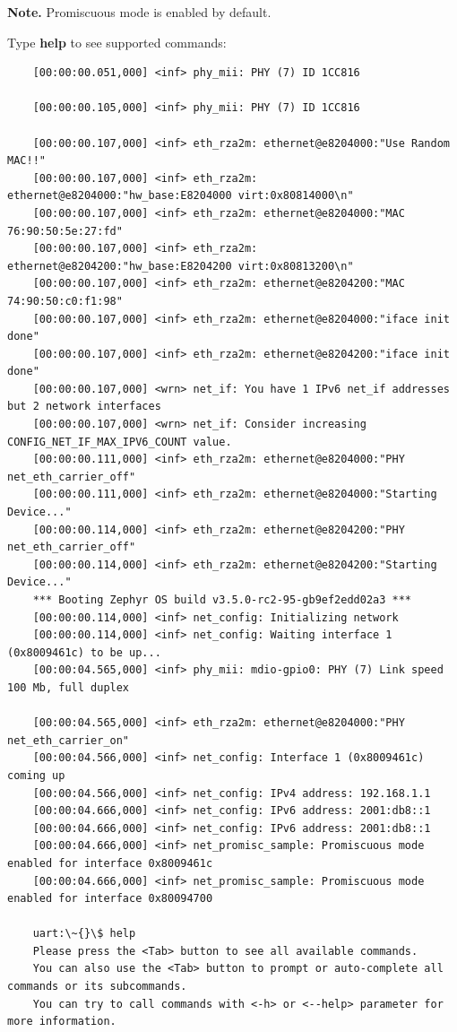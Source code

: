 \documentclass[11pt,a4paper,oneside]{article}
\begin{document}
\textbf{Note.} Promiscuous mode is enabled by default.

Type \textbf{help} to see supported commands:
\begin{lstlisting}
	[00:00:00.051,000] <inf> phy_mii: PHY (7) ID 1CC816

	[00:00:00.105,000] <inf> phy_mii: PHY (7) ID 1CC816

	[00:00:00.107,000] <inf> eth_rza2m: ethernet@e8204000:"Use Random MAC!!"
	[00:00:00.107,000] <inf> eth_rza2m: ethernet@e8204000:"hw_base:E8204000 virt:0x80814000\n"
	[00:00:00.107,000] <inf> eth_rza2m: ethernet@e8204000:"MAC 76:90:50:5e:27:fd"
	[00:00:00.107,000] <inf> eth_rza2m: ethernet@e8204200:"hw_base:E8204200 virt:0x80813200\n"
	[00:00:00.107,000] <inf> eth_rza2m: ethernet@e8204200:"MAC 74:90:50:c0:f1:98"
	[00:00:00.107,000] <inf> eth_rza2m: ethernet@e8204000:"iface init done"
	[00:00:00.107,000] <inf> eth_rza2m: ethernet@e8204200:"iface init done"
	[00:00:00.107,000] <wrn> net_if: You have 1 IPv6 net_if addresses but 2 network interfaces
	[00:00:00.107,000] <wrn> net_if: Consider increasing CONFIG_NET_IF_MAX_IPV6_COUNT value.
	[00:00:00.111,000] <inf> eth_rza2m: ethernet@e8204000:"PHY net_eth_carrier_off"
	[00:00:00.111,000] <inf> eth_rza2m: ethernet@e8204000:"Starting Device..."
	[00:00:00.114,000] <inf> eth_rza2m: ethernet@e8204200:"PHY net_eth_carrier_off"
	[00:00:00.114,000] <inf> eth_rza2m: ethernet@e8204200:"Starting Device..."
	*** Booting Zephyr OS build v3.5.0-rc2-95-gb9ef2edd02a3 ***
	[00:00:00.114,000] <inf> net_config: Initializing network
	[00:00:00.114,000] <inf> net_config: Waiting interface 1 (0x8009461c) to be up...
	[00:00:04.565,000] <inf> phy_mii: mdio-gpio0: PHY (7) Link speed 100 Mb, full duplex

	[00:00:04.565,000] <inf> eth_rza2m: ethernet@e8204000:"PHY net_eth_carrier_on"
	[00:00:04.566,000] <inf> net_config: Interface 1 (0x8009461c) coming up
	[00:00:04.566,000] <inf> net_config: IPv4 address: 192.168.1.1
	[00:00:04.666,000] <inf> net_config: IPv6 address: 2001:db8::1
	[00:00:04.666,000] <inf> net_config: IPv6 address: 2001:db8::1
	[00:00:04.666,000] <inf> net_promisc_sample: Promiscuous mode enabled for interface 0x8009461c
	[00:00:04.666,000] <inf> net_promisc_sample: Promiscuous mode enabled for interface 0x80094700

	uart:\~{}\$ help
	Please press the <Tab> button to see all available commands.
	You can also use the <Tab> button to prompt or auto-complete all commands or its subcommands.
	You can try to call commands with <-h> or <--help> parameter for more information.


\end{lstlisting}
\end{document}
